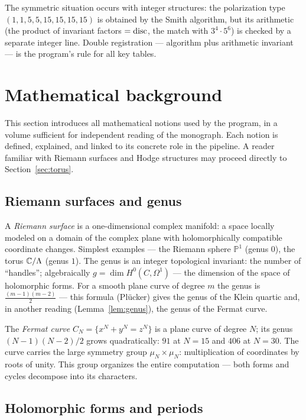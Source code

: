 The symmetric situation occurs with integer structures: the
polarization type $(1,1,5,5,15,15,15,15)$ is obtained by the Smith
algorithm, but its arithmetic (the product of invariant factors
$=\operatorname{disc}$, the match with $3^4\cdot5^6$) is checked by a separate
integer line. Double registration --- algorithm plus arithmetic
invariant --- is the program's rule for all key tables.

\section{Mathematical background}\label{sec:background}

This section introduces all mathematical notions used by the
program, in a volume sufficient for independent reading of the
monograph. Each notion is defined, explained, and linked to its
concrete role in the pipeline. A reader familiar with Riemann
surfaces and Hodge structures may proceed directly to
Section~\ref{sec:torus}.

\subsection{Riemann surfaces and genus}

A \emph{Riemann surface} is a one-dimensional complex manifold: a
space locally modeled on a domain of the complex plane with
holomorphically compatible coordinate changes. Simplest examples ---
the Riemann sphere $\mathbb{P}^1$ (genus $0$), the torus
$\mathbb{C}/\Lambda$ (genus $1$). The genus is an integer topological
invariant: the number of ``handles''; algebraically
$g=\dim H^0(C,\Omega^1)$ --- the dimension of the space of
holomorphic forms. For a smooth plane curve of degree $m$ the genus
is $\tfrac{(m-1)(m-2)}{2}$ --- this formula (Pl\"ucker) gives the
genus of the Klein quartic and, in another reading
(Lemma~\ref{lem:genus}), the genus of the Fermat curve.

The \emph{Fermat curve} $C_N=\{x^N+y^N=z^N\}$ is a plane curve of
degree $N$; its genus $(N-1)(N-2)/2$ grows quadratically: $91$ at
$N=15$ and $406$ at $N=30$. The curve carries the large symmetry
group $\mu_N\times\mu_N$: multiplication of coordinates by roots of
unity. This group organizes the entire computation --- both forms
and cycles decompose into its characters.

\subsection{Holomorphic forms and periods}

